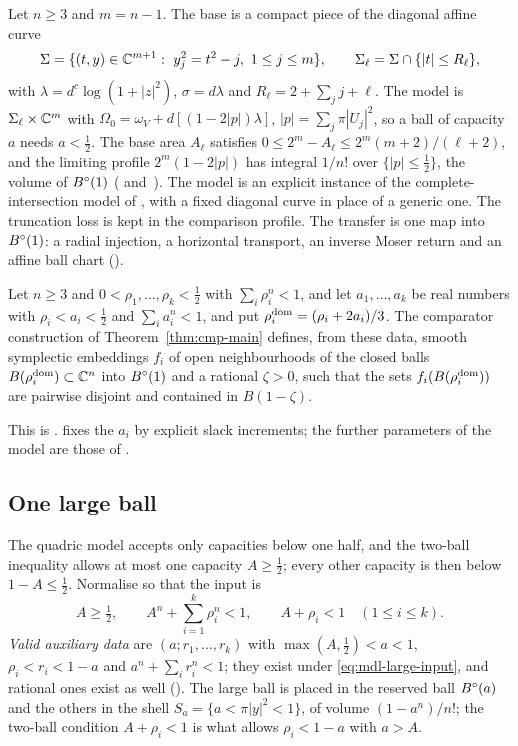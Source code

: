 Let $n\ge3$ and $m=n-1$. The base is a compact piece of the diagonal affine curve
\[
 \Sigma=\{(t,y)\in\mathbb{C}^{m+1}:\ y_j^2=t^2-j,\ 1\le j\le m\},\qquad \Sigma_\ell=\Sigma\cap\{|t|\le R_\ell\},
\]
with $\lambda=d^c\log(1+|z|^2)$, $\sigma=d\lambda$ and $R_\ell=2+\sum_jj+\ell$. The model is
$\Sigma_\ell\times\mathbb{C}^m$ with $\Omega_0=\omega_V+d[(1-2|p|)\lambda]$, $|p|=\sum_j\pi|U_j|^2$, so a ball of capacity
$a$ needs $a<\frac12$. The base area $A_\ell$ satisfies $0\le2^m-A_\ell\le2^m(m+2)/(\ell+2)$, and the limiting
profile $2^m(1-2|p|)$ has integral $1/n!$ over $\{|p|\le\frac12\}$, the volume of $B^{\circ}(1)$
( and~). The model is an explicit instance of the complete-intersection model of \cite[\S5.2]{OpenAI2026}, with a fixed
diagonal curve in place of a generic one. The truncation loss is kept in the comparison profile.
The transfer is one map into $B^{\circ}(1)$: a radial injection, a horizontal transport, an inverse Moser return and an
affine ball chart ().

\begin{theorem}\label{thm:mdl-qdr}
Let $n\ge3$ and $0<\rho_1,\dots,\rho_k<\frac12$ with $\sum_i\rho_i^n<1$, and let $a_1,\dots,a_k$ be real numbers with
$\rho_i<a_i<\frac12$ and $\sum_ia_i^n<1$, and put $\rho_i^{\rm dom}=(\rho_i+2a_i)/3$. The comparator construction of
Theorem~\ref{thm:cmp-main} defines, from these data, smooth symplectic embeddings $f_i$ of open neighbourhoods of the
closed balls $B(\rho_i^{\rm dom})\subset\mathbb{C}^n$ into $B^{\circ}(1)$ and a rational $\zeta>0$, such that the sets
$f_i(B(\rho_i^{\rm dom}))$ are pairwise disjoint and contained in $B(1-\zeta)$.
\end{theorem}

This is .  fixes the $a_i$ by explicit
slack increments; the further parameters of the model are those of .

\subsection{One large ball}\label{sec:mdl-lrg}

The quadric model accepts only capacities below one half, and the two-ball inequality allows at most one capacity
$A\ge\frac12$; every other capacity is then below $1-A\le\frac12$. Normalise so that the input is
\begin{equation}\label{eq:mdl-large-input}
 A\ge\tfrac12,\qquad A^n+\sum_{i=1}^k\rho_i^n<1,\qquad A+\rho_i<1\quad(1\le i\le k).
\end{equation}
\emph{Valid auxiliary data} are $(a;r_1,\dots,r_k)$ with $\max(A,\frac12)<a<1$, $\rho_i<r_i<1-a$ and
$a^n+\sum_ir_i^n<1$; they exist under \eqref{eq:mdl-large-input}, and rational ones exist as well
(). The large ball is placed in the reserved ball
$B^{\circ}(a)$ and the others in the shell $S_a=\{a<\pi|y|^2<1\}$, of volume $(1-a^n)/n!$; the two-ball condition
$A+\rho_i<1$ is what allows $\rho_i<1-a$ with $a>A$.

